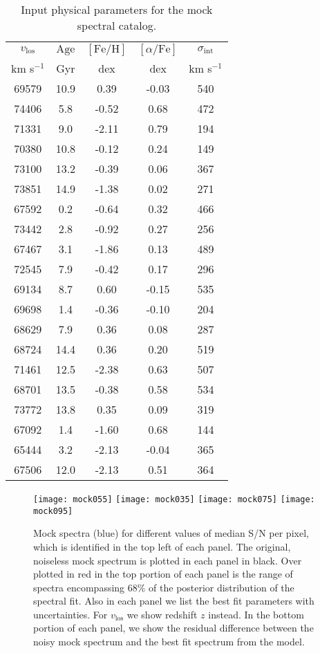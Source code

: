 \documentclass[twocolumn]{aastex6}
\def\feh{\mathrm{[Fe/H]}}
\def\afe{[\alpha/\mathrm{Fe}]}
\def\age{\mathrm{Age}}
\def\vlos{v_\mathrm{los}}
\def\disp{\sigma_\mathrm{int}}
\begin{document}
\begin{table}
\centering
\caption{Input physical parameters for the mock spectral catalog.}
\label{MockParams}
\begin{tabular}{ c c c c c }
\hline
\hline
$\vlos$ & $\age$ & $\feh$ & $\afe$ & $\disp$\\
km s$^{-1}$  & Gyr & dex & dex & km s$^{-1}$\\
 \hline
 69579 & 10.9 & 0.39 & -0.03 & 540\\
74406 & 5.8 & -0.52 & 0.68 & 472 \\
71331 & 9.0 & -2.11 & 0.79 & 194\\
70380 & 10.8 & -0.12 & 0.24 & 149\\
73100 & 13.2 & -0.39 & 0.06 & 367\\
73851 & 14.9 & -1.38 & 0.02 & 271\\
67592 & 0.2 & -0.64 & 0.32 & 466\\
73442 & 2.8 & -0.92 & 0.27 & 256\\
67467 & 3.1 & -1.86 & 0.13 & 489\\
72545 & 7.9 & -0.42 & 0.17 & 296\\
69134 & 8.7 & 0.60 & -0.15 & 535\\
69698 & 1.4 & -0.36 & -0.10 & 204\\
68629 & 7.9 & 0.36 & 0.08 & 287\\
68724 & 14.4 & 0.36 & 0.20 & 519\\
71461 & 12.5 & -2.38 & 0.63 & 507\\
68701 & 13.5 & -0.38 & 0.58 & 534\\
73772 & 13.8 & 0.35 & 0.09 & 319\\
67092 & 1.4 & -1.60 & 0.68 & 144\\
65444 & 3.2 & -2.13 & -0.04 & 365\\
67506 & 12.0 & -2.13 & 0.51 & 364\\
\hline
\end{tabular}
\end{table}

\begin{figure*}
\centering
\texttt{[image: mock055]}
\texttt{[image: mock035]}
\texttt{[image: mock075]}
\texttt{[image: mock095]}
\caption{Mock spectra (blue) for different values of median S/N per pixel, which is identified in the top left of each panel.  The original, noiseless mock spectrum is plotted in each panel in black.  Over plotted in red in the top portion of each panel is the range of spectra encompassing 68\% of the posterior distribution of the spectral fit.  Also in each panel we list the best fit parameters with uncertainties.  For $\vlos$ we show redshift $z$ instead.  In the bottom portion of each panel, we show the residual difference between the noisy mock spectrum and the best fit spectrum from the model.}
\label{MockBestFits}
\end{figure*}
\end{document}
